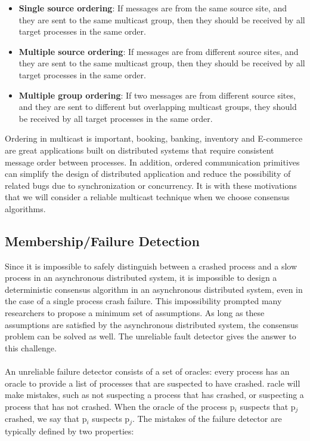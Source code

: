 \documentclass[12pt, a4paper]{article}
\begin{document}
\begin{itemize}
  \item \textbf{Single source ordering}: If messages are from the same source 
  site, and they are sent to the same multicast group, then they should be 
  received by all target processes in the same order. 
  \item \textbf{Multiple source ordering}: If messages are from different 
  source sites, and they are sent to the same multicast group, 
  then they should be received by all target processes in the same order. 
  \item \textbf{Multiple group ordering}: If two messages are from different 
  source sites, and they are sent to different but overlapping multicast groups, 
  they should be received by all target processes in the same order.
\end{itemize}

Ordering in multicast is important, booking, banking, inventory and E-commerce 
are great applications built on distributed systems that require consistent 
message order between processes. In addition, ordered communication primitives 
can simplify the design of distributed application and reduce the possibility of 
related bugs due to synchronization or concurrency\cite{garcia1991ordered}. It 
is with these motivations that we will consider a reliable multicast technique 
when we choose consensus algorithms.

\subsection{Membership/Failure Detection}

Since it is impossible to safely distinguish between a crashed process and a 
slow process in an asynchronous distributed system, it is impossible to design 
a deterministic consensus algorithm in an asynchronous distributed system, even 
in the case of a single process crash failure\cite{fischer1985impossibility}. 
This impossibility prompted many researchers to propose a minimum set of 
assumptions. As long as these assumptions are satisfied by the asynchronous 
distributed system, the consensus problem can be solved as well. The unreliable 
fault detector gives the answer to this challenge\cite{chandra1996unreliable}. 

\paragraph{}
An unreliable failure detector consists of a set of oracles: every process has 
an oracle to provide a list of processes that are suspected to have crashed. 
racle will make mistakes, such as not suspecting a process that has crashed, or 
suspecting a process that has not crashed. When the oracle of the process 
p$_{i}$ suspects that p$_{j}$ crashed, we say that p$_{i}$ suspects p$_{j}$. 
The mistakes of the failure detector are typically defined by two properties:
\end{document}
